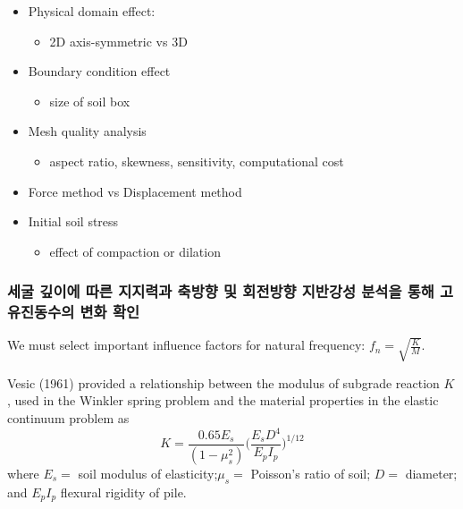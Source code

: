 \documentclass[
  letterpaper,
  DIV=11,
  numbers=noendperiod]{scrreprt}
\providecommand{\tightlist}{%
  \setlength{\itemsep}{0pt}\setlength{\parskip}{0pt}}\usepackage{longtable,booktabs,array}
\begin{document}
\begin{itemize}
\tightlist
\item
  Physical domain effect:

  \begin{itemize}
  \tightlist
  \item
    2D axis-symmetric vs 3D
  \end{itemize}
\item
  Boundary condition effect

  \begin{itemize}
  \tightlist
  \item
    size of soil box
  \end{itemize}
\item
  Mesh quality analysis

  \begin{itemize}
  \tightlist
  \item
    aspect ratio, skewness, sensitivity, computational cost
  \end{itemize}
\item
  Force method vs Displacement method
\item
  Initial soil stress

  \begin{itemize}
  \tightlist
  \item
    effect of compaction or dilation
  \end{itemize}
\end{itemize}

\hypertarget{uxc138uxad74-uxae4auxc774uxc5d0-uxb530uxb978-uxc9c0uxc9c0uxb825uxacfc-uxcd95uxbc29uxd5a5-uxbc0f-uxd68cuxc804uxbc29uxd5a5-uxc9c0uxbc18uxac15uxc131-uxbd84uxc11duxc744-uxd1b5uxd574-uxace0uxc720uxc9c4uxb3d9uxc218uxc758-uxbcc0uxd654-uxd655uxc778}{%
\subsubsection{세굴 깊이에 따른 지지력과 축방향 및 회전방향 지반강성
분석을 통해 고유진동수의 변화
확인}\label{uxc138uxad74-uxae4auxc774uxc5d0-uxb530uxb978-uxc9c0uxc9c0uxb825uxacfc-uxcd95uxbc29uxd5a5-uxbc0f-uxd68cuxc804uxbc29uxd5a5-uxc9c0uxbc18uxac15uxc131-uxbd84uxc11duxc744-uxd1b5uxd574-uxace0uxc720uxc9c4uxb3d9uxc218uxc758-uxbcc0uxd654-uxd655uxc778}}

We must select important influence factors for natural frequency:
\(f_n = \sqrt{\frac{K}{M}}\).

Vesic (1961) provided a relationship between the modulus of subgrade
reaction \(K\), used in the Winkler spring problem and the material
properties in the elastic continuum problem as \[
K = \frac{0.65 E_s}{(1-\mu^2_s)} \big( \frac{E_s D^4}{E_p I_p} \big)^{1/12}
\] where \(E_s=\) soil modulus of elasticity;\(\mu_s=\) Poisson's ratio
of soil; \(D=\) diameter; and \(E_p I_p\) flexural rigidity of pile.
\end{document}
